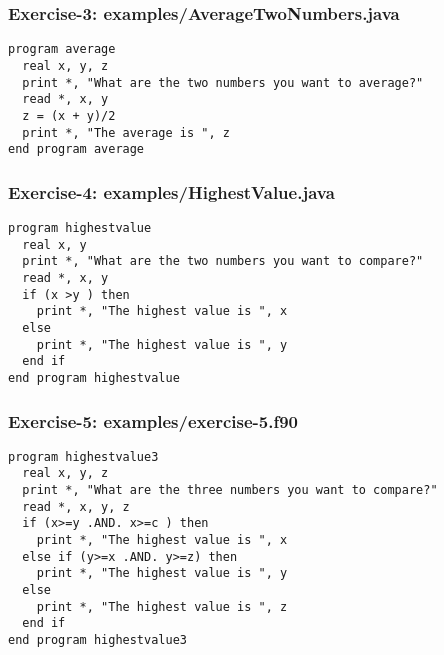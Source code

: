 \documentclass[xcolor=dvipsnames,dvip,notes=show,table]{beamer}
\begin{document}
\begin{frame}[fragile]
\frametitle{Exercise-3: examples/AverageTwoNumbers.java}
\scriptsize
\begin{lstlisting}
program average
  real x, y, z
  print *, "What are the two numbers you want to average?"
  read *, x, y
  z = (x + y)/2
  print *, "The average is ", z
end program average
\end{lstlisting}
\end{frame}




\begin{frame}[fragile]
\frametitle{Exercise-4: examples/HighestValue.java}
\scriptsize
\begin{lstlisting}
program highestvalue
  real x, y
  print *, "What are the two numbers you want to compare?"
  read *, x, y
  if (x >y ) then 
    print *, "The highest value is ", x
  else 
    print *, "The highest value is ", y
  end if
end program highestvalue
\end{lstlisting}
\end{frame}




\begin{frame}[fragile]
\frametitle{Exercise-5: examples/exercise-5.f90}
\scriptsize
\begin{lstlisting}
program highestvalue3
  real x, y, z
  print *, "What are the three numbers you want to compare?"
  read *, x, y, z
  if (x>=y .AND. x>=c ) then 
    print *, "The highest value is ", x
  else if (y>=x .AND. y>=z) then
    print *, "The highest value is ", y
  else 
    print *, "The highest value is ", z
  end if
end program highestvalue3
\end{lstlisting}
\end{frame}


\end{document}
